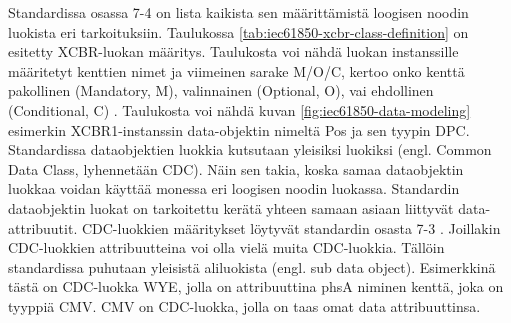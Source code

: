 Standardissa osassa 7-4 on lista kaikista sen määrittämistä loogisen noodin luokista eri tarkoituksiin. Taulukossa \ref{tab:iec61850-xcbr-class-definition} on esitetty XCBR-luokan määritys. Taulukosta voi nähdä luokan instanssille määritetyt kenttien nimet ja viimeinen sarake M/O/C, kertoo onko kenttä pakollinen (Mandatory, M), valinnainen (Optional, O), vai ehdollinen (Conditional, C) \cite[s.~106]{IEC61850-7-4}. Taulukosta voi nähdä kuvan \ref{fig:iec61850-data-modeling} esimerkin XCBR1-instanssin data-objektin nimeltä Pos ja sen tyypin DPC. Standardissa dataobjektien luokkia kutsutaan yleisiksi luokiksi (engl. Common Data Class, lyhennetään CDC). Näin sen takia, koska samaa dataobjektin luokkaa voidan käyttää monessa eri loogisen noodin luokassa. Standardin dataobjektin luokat on tarkoitettu kerätä yhteen samaan asiaan liittyvät data-attribuutit. CDC-luokkien määritykset löytyvät standardin osasta 7-3 \cite[s.~26]{IEC61850-1}. Joillakin CDC-luokkien attribuutteina voi olla vielä muita CDC-luokkia. Tällöin standardissa puhutaan yleisistä aliluokista (engl. sub data object). Esimerkkinä tästä on CDC-luokka WYE, jolla on attribuuttina phsA niminen kenttä, joka on tyyppiä CMV. CMV on CDC-luokka, jolla on taas omat data attribuuttinsa. \cite[s.~51,61]{IEC61850-7-2} \cite[s.~36]{IEC61850-7-3}

